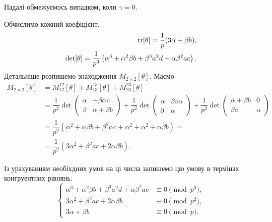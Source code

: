 \documentclass{thesis}
\begin{document}
Надалі обмежуємось випадком, коли $\gamma = 0$.

Обчислимо кожний коефіцієнт.
\begin{align*}
\operatorname{tr} [\theta] = \dfrac{1}{p} (3 \alpha + \beta b), \\
\det [\theta] = \dfrac{1}{p^3} \left( \alpha^3 + \alpha^2 \beta b + \beta^3 a^2 d + \alpha \beta^2 ac \right).
\end{align*}
Детальніше розпишемо знаходження $M_{2 \times 2}[\theta]$. Маємо
\begin{align*}
M_{2 \times 2}[\theta] & = M_{12}^{12}[\theta] + M_{13}^{13}[\theta] + M_{23}^{23}[\theta] \\
& = \dfrac{1}{p^2} \det \begin{pmatrix}
\alpha & -\beta \alpha c \\
\beta & \alpha + \beta b
\end{pmatrix} + \dfrac{1}{p^2} \det \begin{pmatrix}
\alpha & \beta a \alpha \\
0 & \alpha
\end{pmatrix} + \dfrac{1}{p^2} \det \begin{pmatrix}
\alpha + \beta b & 0 \\
\beta a & \alpha
\end{pmatrix} \\
 & = \dfrac{1}{p^2} \left( \alpha^2 + \alpha \beta b + \beta^2 \alpha c + \alpha^2 + \alpha^2 + \alpha \beta b \right) = \\ 
& = \dfrac{1}{p^2} \left( 3 \alpha^2 + \beta^2 a c + 2 \alpha \beta b\right).
\end{align*}

Із урахуванням необіхдних умов на ці числа запишемо цю умову в термінах конгруентних рівнянь:
\begin{equation}
\label{system_of_equations_when_theta_cubed_in_ring}
    \begin{cases}
      \alpha^3 + \alpha^2 \beta b + \beta^3 a^2 d + \alpha \beta^2 a c & \equiv 0 \pmod {p^3}, \\
    3\alpha^2 + \beta^2 ac + 2 \alpha \beta b & \equiv 0 \pmod {p^2}, \\
      3 \alpha + \beta b & \equiv 0 \pmod p.
    \end{cases}
\end{equation}
\end{document}
